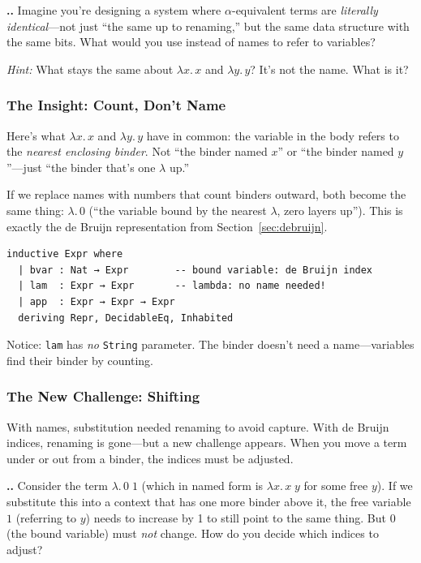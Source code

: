 \documentclass[11pt,a4paper]{article}
\newcounter{exercise}[section]
\renewcommand{\theexercise}{\thesection.\arabic{exercise}}
\theoremstyle{definition}
\newcommand{\lam}{\lambda}
\begin{document}
\begin{exercisebox}
\textbf{\theexercise.}\; Imagine you're designing a system where $\alpha$-equivalent terms are \emph{literally identical}---not just ``the same up to renaming,'' but the same data structure with the same bits. What would you use instead of names to refer to variables?

\emph{Hint:} What stays the same about $\lam x.\, x$ and $\lam y.\, y$? It's not the name. What is it?
\end{exercisebox}

\subsubsection{The Insight: Count, Don't Name}

Here's what $\lam x.\, x$ and $\lam y.\, y$ have in common: the variable in
the body refers to the \emph{nearest enclosing binder}. Not ``the binder named
$x$'' or ``the binder named $y$''---just ``the binder that's one $\lam$ up.''

If we replace names with numbers that count binders outward, both become the
same thing: $\lam.\, 0$ (``the variable bound by the nearest $\lam$, zero
layers up''). This is exactly the de Bruijn representation from
Section~\ref{sec:debruijn}.

\begin{verbatim}
inductive Expr where
  | bvar : Nat → Expr        -- bound variable: de Bruijn index
  | lam  : Expr → Expr       -- lambda: no name needed!
  | app  : Expr → Expr → Expr
  deriving Repr, DecidableEq, Inhabited
\end{verbatim}

Notice: \texttt{lam} has \emph{no} \texttt{String} parameter. The binder
doesn't need a name---variables find their binder by counting.

\subsubsection{The New Challenge: Shifting}

With names, substitution needed renaming to avoid capture. With de Bruijn
indices, renaming is gone---but a new challenge appears. When you move a term
under or out from a binder, the indices must be adjusted.

\begin{exercisebox}
\textbf{\theexercise.}\; Consider the term $\lam.\, 0\; 1$ (which in named form is $\lam x.\, x\;y$ for some free $y$). If we substitute this into a context that has one more binder above it, the free variable $1$ (referring to $y$) needs to increase by 1 to still point to the same thing. But $0$ (the bound variable) must \emph{not} change. How do you decide which indices to adjust?
\end{exercisebox}
\end{document}
